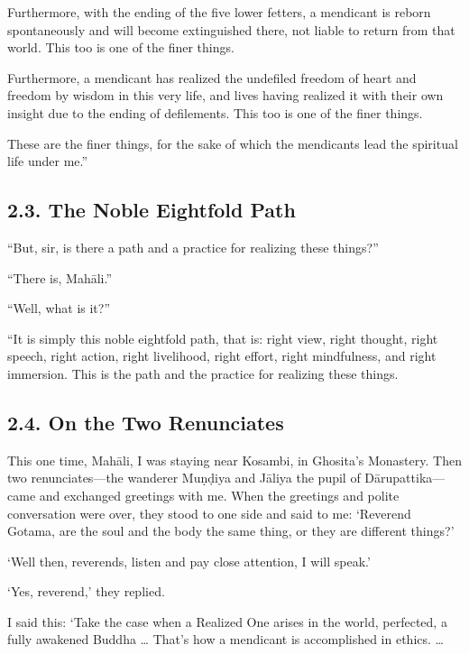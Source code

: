 \documentclass[12pt,openany]{book}%
\begin{document}
Furthermore, with the ending of the five lower fetters, a mendicant is reborn spontaneously and will become extinguished there, not liable to return from that world. This too is one of the finer things. 

Furthermore, a mendicant has realized the undefiled freedom of heart and freedom by wisdom in this very life, and lives having realized it with their own insight due to the ending of defilements. This too is one of the finer things. 

These are the finer things, for the sake of which the mendicants lead the spiritual life under me.” 

\subsection*{2.3. The Noble Eightfold Path }

“But, sir, is there a path and a practice for realizing these things?” 

“There is, \textsanskrit{Mahāli}.” 

“Well, what is it?” 

“It is simply this noble eightfold path, that is: right view, right thought, right speech, right action, right livelihood, right effort, right mindfulness, and right immersion. This is the path and the practice for realizing these things. 

\subsection*{2.4. On the Two Renunciates }

This one time, \textsanskrit{Mahāli}, I was staying near Kosambi, in Ghosita’s Monastery. Then two renunciates—the wanderer \textsanskrit{Muṇḍiya} and \textsanskrit{Jāliya} the pupil of \textsanskrit{Dārupattika}—came and exchanged greetings with me. When the greetings and polite conversation were over, they stood to one side and said to me: ‘Reverend Gotama, are the soul and the body the same thing, or they are different things?’ 

‘Well then, reverends, listen and pay close attention, I will speak.’ 

‘Yes, reverend,’ they replied. 

I said this: ‘Take the case when a Realized One arises in the world, perfected, a fully awakened Buddha … That’s how a mendicant is accomplished in ethics. … 
\end{document}
